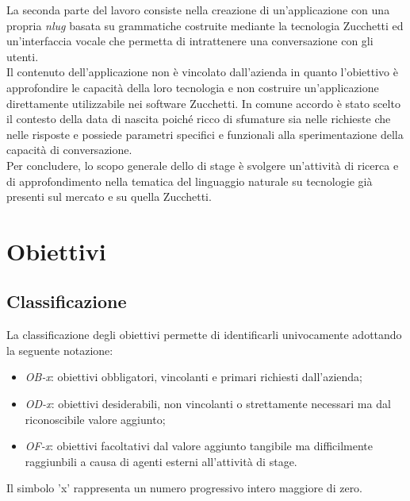 La seconda parte del lavoro consiste nella creazione di un'applicazione con una propria \emph{\gls{nlug}} basata su grammatiche costruite mediante la tecnologia Zucchetti ed un'interfaccia vocale che permetta di intrattenere una conversazione con gli utenti. \\
Il contenuto dell'applicazione non è vincolato dall'azienda in quanto l'obiettivo è approfondire le capacità della loro tecnologia e non costruire un'applicazione direttamente utilizzabile nei software Zucchetti. In comune accordo è stato scelto il contesto della data di nascita poiché ricco di sfumature sia nelle richieste che nelle risposte e possiede parametri specifici e funzionali alla sperimentazione della capacità di conversazione. \\
Per concludere, lo scopo generale dello di stage è svolgere un'attività di ricerca e di approfondimento nella tematica del linguaggio naturale su tecnologie già presenti sul mercato e su quella Zucchetti.

\section{Obiettivi}
\label{section:obiettivi}
	\subsection{Classificazione}
	La classificazione degli obiettivi permette di identificarli univocamente adottando la seguente notazione:
	\begin{itemize}
		\item \textit{OB-x}: obiettivi obbligatori, vincolanti e primari richiesti dall'azienda;
		\item \textit{OD-x}: obiettivi desiderabili, non vincolanti o strettamente necessari ma dal riconoscibile valore aggiunto;
		\item \textit{OF-x}: obiettivi facoltativi dal valore aggiunto tangibile ma difficilmente raggiunbili a causa di agenti esterni all'attività di stage.
	\end{itemize}
	Il simbolo 'x' rappresenta un numero progressivo intero maggiore di zero.
	
